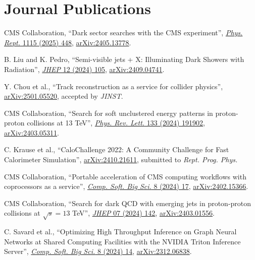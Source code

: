 \section{Journal Publications}
\begin{description}[leftmargin=12pt,font=\normalfont,labelsep=0em]
\item CMS Collaboration, ``Dark sector searches with the CMS experiment'', \href{https://doi.org/10.1016/j.physrep.2024.09.013}{\emph{Phys. Rept.} 1115 (2025) 448}, \href{https://arxiv.org/abs/2405.13778}{arXiv:2405.13778}. %
\item \begin{sloppypar}B. Liu and K. Pedro, ``Semi-visible jets + X: Illuminating Dark Showers with Radiation'', \href{https://doi.org/10.1007/JHEP12(2024)105}{\emph{JHEP} 12 (2024) 105}, \href{https://arxiv.org/abs/2409.04741}{arXiv:2409.04741}.\end{sloppypar} %
\item Y. Chou et al., ``Track reconstruction as a service for collider physics'', \href{https://arxiv.org/abs/2501.05520}{arXiv:2501.05520}, accepted by \emph{JINST}. %
\item CMS Collaboration, ``Search for soft unclustered energy patterns in proton-proton collisions at 13 TeV'', \href{http://dx.doi.org/10.1103/PhysRevLett.133.191902}{\emph{Phys. Rev. Lett.} 133 (2024) 191902}, \href{https://arxiv.org/abs/2403.05311}{arXiv:2403.05311}. %
\item C. Krause et al., ``CaloChallenge 2022: A Community Challenge for Fast Calorimeter Simulation'', \href{https://arxiv.org/abs/2410.21611}{arXiv:2410.21611}, submitted to \emph{Rept. Prog. Phys.} %
\item CMS Collaboration, ``Portable acceleration of CMS computing workflows with coprocessors as a service'', \href{https://doi.org/10.1007/s41781-024-00124-1}{\emph{Comp. Soft. Big Sci.} 8 (2024) 17}, \href{https://arxiv.org/abs/2402.15366}{arXiv:2402.15366}. %
\item CMS Collaboration, ``Search for dark QCD with emerging jets in proton-proton collisions at $\sqrt{s} = 13$ TeV'', \href{https://doi.org/10.1007/JHEP07(2024)142}{\emph{JHEP} 07 (2024) 142}, \href{https://arxiv.org/abs/2403.01556}{arXiv:2403.01556}. %
\item C. Savard et al., ``Optimizing High Throughput Inference on Graph Neural Networks at Shared Computing Facilities with the NVIDIA Triton Inference Server'', \href{http://doi.org/10.1007/s41781-024-00123-2}{\emph{Comp. Soft. Big Sci.} 8 (2024) 14}, \href{https://arxiv.org/abs/2312.06838}{arXiv:2312.06838}. %

\end{description}
